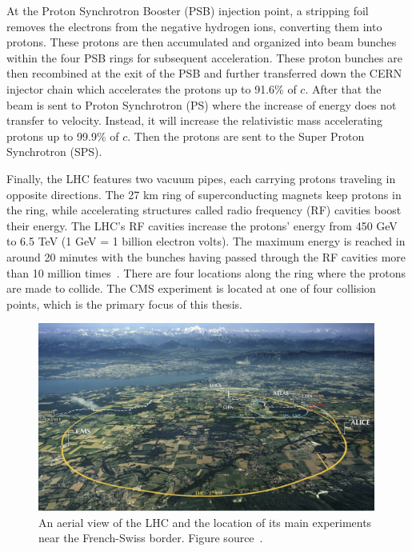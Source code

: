 At the Proton Synchrotron Booster (PSB) injection point, a stripping foil removes the electrons from the negative hydrogen ions, converting them into protons.
These protons are then accumulated and organized into beam bunches within the four PSB rings for subsequent acceleration.
These proton bunches are then recombined at the exit of the PSB and further transferred down the CERN injector chain which accelerates the protons up to 91.6\% of $c$.
After that the beam is sent to Proton Synchrotron (PS) where the increase of energy does not transfer to velocity.
Instead, it will increase the relativistic mass accelerating protons up to 99.9\% of $c$. Then the protons are sent to the Super Proton Synchrotron (SPS).

Finally, the LHC features two vacuum pipes, each carrying protons traveling in opposite directions.
The 27 km ring of superconducting magnets keep protons in the ring,
while accelerating structures called radio frequency (RF) cavities boost their energy.
The LHC's RF cavities increase the protons' energy from 450 GeV to 6.5 TeV (1 GeV = 1 billion electron volts).
The maximum energy is reached in around 20 minutes with the bunches having passed through the RF cavities more than 10 million times~\cite{proton}.
There are four locations along the ring where the protons are made to collide.
The CMS experiment is located at one of four collision points, which is the primary focus of this thesis.

\begin{figure}[t!]
\centering
\includegraphics[width=0.99\textwidth]{figures/LHC_location.png}
\caption[A view of the LHC]
{An aerial view of the LHC and the location of its main experiments near the French-Swiss border. Figure source~\cite{LHC_location}.}
\label{fig:LHC_location}
\end{figure}


